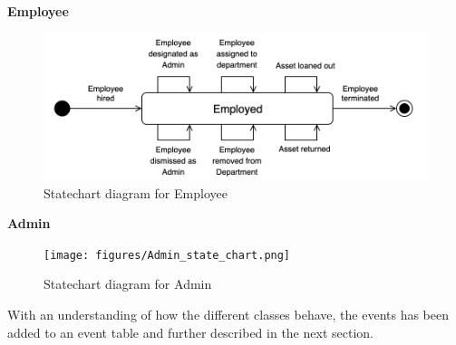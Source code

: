 \Large  \textbf{Employee}  \normalsize
\par
\begin{figure}[H]
    \centering
    \includegraphics[width=1\textwidth]{figures/Employee_state_chart.png}
    \caption{Statechart diagram for Employee}
    \label{fig:employee_statechart}
\end{figure}

\Large  \textbf{Admin}  \normalsize
\par
\begin{figure}[H]
    \centering
    \texttt{[image: figures/Admin\_state\_chart.png]}
    \caption{Statechart diagram for Admin}
    \label{fig:admin_statechart}
\end{figure}

\newline

With an understanding of how the different classes behave, the events has been added to an event table and further described in the next section.


